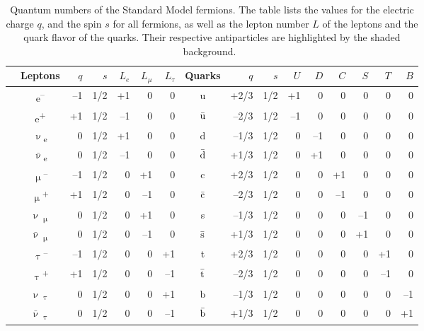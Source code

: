 \begin{table}
\caption[Quantum numbers of the Standard Model fermions]{Quantum numbers of the Standard Model fermions. The table lists the values for the electric charge $q$, and the spin $s$ for all fermions, as well as the lepton number $L$ of the leptons and the quark flavor of the quarks. Their respective antiparticles are highlighted by the shaded background.~\cite[cf. p. 49]{Griffiths}}
\label{tab:Fermions}
\centering
\begin{tabularx}{\textwidth}{c|c|rrrrr|@{\hskip 0.03in}|c|rrrrrrrr}
\hline\hline
& Leptons & $q$ & $s$ & $L_e$ & $L_{\mu}$ & $L_{\tau}$ & Quarks & $q$ & $s$ & $U$ & $D$ & $C$ & $S$ & $T$ & $B$\\
\hline
& e\textsuperscript{--} & --1 & 1/2 & +1 & 0 & 0 & u & +2/3 & 1/2 & +1 & 0 & 0 & 0 & 0 & 0\\
\rowcolor{Gray}
\cellcolor{white}& e\textsuperscript{+} & +1 & 1/2 & --1 & 0 & 0 & $\bar{\rm{u}}$ & --2/3 & 1/2 & --1 & 0 & 0 & 0 & 0 & 0\\
& $\upnu$\textsubscript{e} & 0 & 1/2 & +1 & 0 & 0 & d & --1/3 & 1/2 & 0 & --1 & 0 & 0 & 0 & 0\\
\rowcolor{Gray}
\multirow{-4}{*}{\rotatebox[origin=c]{90}{\parbox[c]{1.9cm}{\centering First generation}}} &$\bar\upnu$\textsubscript{e} & 0 & 1/2 & --1 & 0 & 0 & $\bar{\rm{d}}$ & +1/3 & 1/2 & 0 & +1 & 0 & 0 & 0 & 0\\
\hline
& $\upmu$\textsuperscript{--} & --1 & 1/2 & 0 & +1 & 0 & c & +2/3 & 1/2 & 0 & 0 & +1 & 0 & 0 & 0\\
\rowcolor{Gray}
\cellcolor{white}&$\upmu$\textsuperscript{+} & +1 & 1/2 & 0 & --1 & 0 & $\bar{\rm{c}}$ & --2/3 & 1/2 & 0 & 0 & --1 & 0 & 0 & 0\\
& $\upnu$\textsubscript{$\upmu$} & 0 & 1/2 & 0 & +1 & 0 & s & --1/3 & 1/2 & 0 & 0 & 0 & --1 & 0 & 0\\
\rowcolor{Gray}
\multirow{-4}{*}{\rotatebox[origin=c]{90}{\parbox[c]{1.9cm}{\centering Second generation}}}& $\bar\upnu$\textsubscript{$\upmu$} & 0 & 1/2 & 0 & --1 & 0  & $\bar{\rm{s}}$ & +1/3 & 1/2 & 0 & 0 & 0 & +1 & 0 & 0\\
\hline
& $\uptau$\textsuperscript{--} & --1 & 1/2 & 0 & 0 & +1 & t & +2/3 & 1/2 & 0 & 0 & 0 & 0 & +1 & 0\\
\rowcolor{Gray}
\cellcolor{white}& $\uptau$\textsuperscript{+} & +1 & 1/2 & 0 & 0 & --1 & $\bar{\rm{t}}$ & --2/3 & 1/2 & 0 & 0 & 0 & 0 & --1 & 0\\
& $\upnu$\textsubscript{$\uptau$} & 0 & 1/2 & 0 & 0 & +1 & b & --1/3 & 1/2 & 0 & 0 & 0 & 0 & 0 & --1\\
\rowcolor{Gray}
\multirow{-4}{*}{\rotatebox[origin=c]{90}{\parbox[c]{1.9cm}{\centering Third generation}}}& $\bar\upnu$\textsubscript{$\uptau$} & 0 & 1/2 & 0 & 0 & --1 & $\bar{\rm{b}}$ & +1/3 & 1/2 & 0 & 0 & 0 & 0 & 0 & +1\\
\hline\hline
\end{tabularx}
\end{table}
